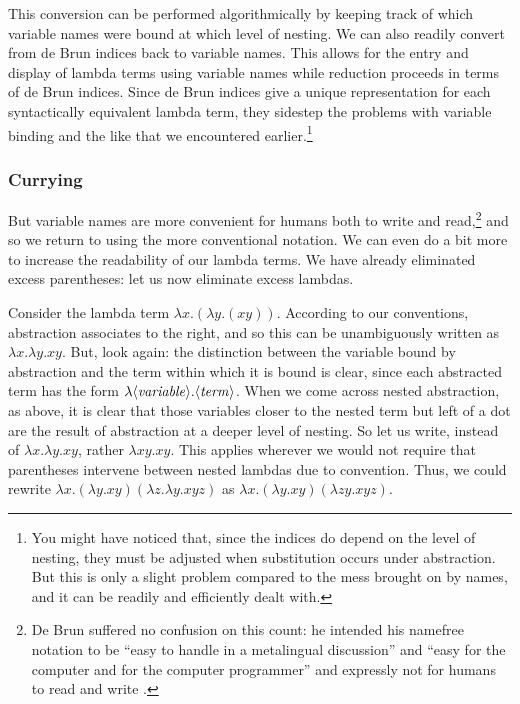 This conversion can be performed algorithmically by keeping track of which variable names were bound at which level of nesting. We can also readily convert from de Bru\ij n indices back to variable names. This allows for the entry and display of lambda terms using variable names while reduction proceeds in terms of de Bru\ij n indices. Since de Bru\ij n indices give a unique representation for each syntactically equivalent lambda term, they sidestep the problems with variable binding and the like that we encountered earlier.\footnote{You might have noticed that, since the indices do depend on the level of nesting, they must be adjusted when substitution occurs under abstraction. But this is only a slight problem compared to the mess brought on by names, and it can be readily and efficiently dealt with.}

\subsubsection{Currying}\label{untyped:currying}
But variable names are more convenient for humans both to write and read,\footnote{De Bru\ij n suffered no confusion on this count: he intended his namefree notation to be ``easy to handle in a metalingual discussion'' and ``easy for the computer and for the computer programmer'' and expressly not for humans to read and write \citep[pp.~381--82]{Bruijn:Lambda:1972}.} and so we return to using the more conventional notation. We can even do a bit more to increase the readability of our lambda terms. We have already eliminated excess parentheses: let us now eliminate excess lambdas.

Consider the lambda term $\lambda x. (\lambda y. (xy))$. According to our conventions, abstraction associates to the right, and so this can be unambiguously written as $\lambda x. \lambda y. xy$. But, look again: the distinction between the variable bound by abstraction and the term within which it is bound is clear, since each abstracted term has the form $\lambda \text{$\langle$\textit{variable}$\rangle$} . \text{$\langle$\textit{term}$\rangle$}$. When we come across nested abstraction, as above, it is clear that those variables closer to the nested term but left of a dot are the result of abstraction at a deeper level of nesting. So let us write, instead of $\lambda x. \lambda y. xy$, rather $\lambda x y . xy$. This applies wherever we would not require that parentheses intervene between nested lambdas due to convention. Thus, we could rewrite $\lambda x. (\lambda y. xy) (\lambda z. \lambda y. xyz)$ as $\lambda x. (\lambda y. xy) (\lambda zy.xyz)$.

